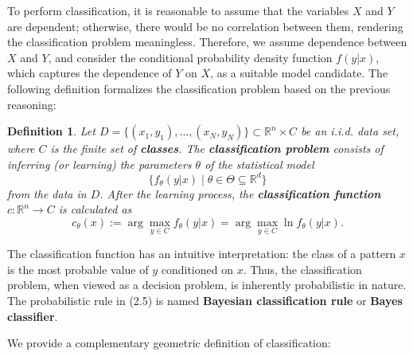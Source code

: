 \documentclass{report}
\newtheorem{definition}{Definition}[chapter]
\begin{document}
To perform classification, it is reasonable to assume that the variables $X$ and $Y$ are dependent; otherwise, there would be no correlation between them, rendering the classification problem meaningless. Therefore, we assume dependence between $X$ and $Y$, and consider the conditional probability density function $f(y|x)$, which captures the dependence of $Y$ on $X$, as a suitable model candidate. The following definition formalizes the classification problem based on the previous reasoning:

\begin{definition}
Let $D = \{(x_1,y_1),\dots,(x_N,y_N)\} \subset \mathbb{R}^n \times C$ be an i.i.d. data set, where $C$ is the finite set of \textbf{classes}. The \textbf{classification problem} consists of inferring (or learning) the parameters $\theta$ of the statistical model
\begin{equation}
\{f_\theta(y|x) \mid \theta \in \Theta \subseteq \mathbb{R}^d\}
\end{equation}
from the data in $D$. After the learning process, the \textbf{classification function} $c : \mathbb{R}^n \to C$ is calculated as
\begin{equation}
c_\theta(x) := \arg \max_{y \in C} f_\theta(y|x) = \arg \max_{y \in C} \ln f_\theta(y|x).
\end{equation}
\end{definition}

The classification function has an intuitive interpretation: the class of a pattern $x$ is the most probable value of $y$ conditioned on $x$. Thus, the classification problem, when viewed as a decision problem, is inherently probabilistic in nature. The probabilistic rule in (2.5) is named \textbf{Bayesian classification rule} or \textbf{Bayes classifier}.

We provide a complementary geometric definition of classification:
\end{document}
